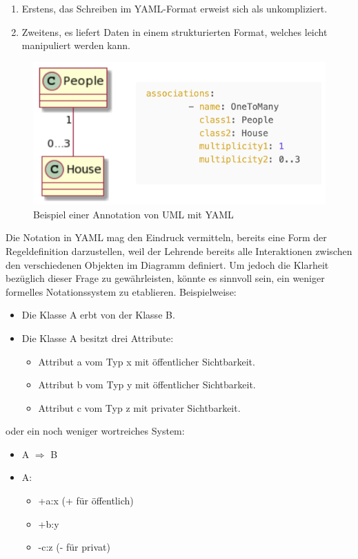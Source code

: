 \begin{enumerate}
    \item Erstens, das Schreiben im YAML-Format erweist sich als unkompliziert.
    \item Zweitens, es liefert Daten in einem strukturierten Format, welches leicht manipuliert werden kann.
\end{enumerate}


\begin{figure}
	\centering
	\includegraphics[width=15cm]{images/yaml-uml.png}
	\caption{Beispiel einer Annotation von UML mit YAML}
	\label{fig:yaml-uml}
\end{figure}


Die Notation in YAML mag den Eindruck vermitteln, bereits eine Form der Regeldefinition darzustellen, weil der Lehrende bereits alle Interaktionen zwischen den verschiedenen Objekten im Diagramm definiert. Um jedoch die Klarheit bezüglich dieser Frage zu gewährleisten, könnte es sinnvoll sein, ein weniger formelles Notationssystem zu etablieren. Beispielweise:

\begin{itemize}
    \item Die Klasse A erbt von der Klasse B.
    \item Die Klasse A besitzt drei Attribute:
    \begin{itemize}
        \item Attribut a vom Typ x mit öffentlicher Sichtbarkeit.
        \item Attribut b vom Typ y mit öffentlicher Sichtbarkeit.
        \item Attribut c vom Typ z mit privater Sichtbarkeit.
    \end{itemize}
\end{itemize}

oder ein noch weniger wortreiches System: 

\begin{itemize}
    \item A $\Rightarrow$ B 
    \item A:
    \begin{itemize}
        \item +a:x (+ für öffentlich)
        \item +b:y
        \item -c:z (- für privat)
    \end{itemize}
\end{itemize}


